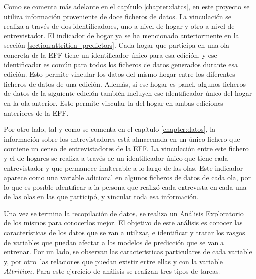 Como se comenta más adelante en el capítulo \ref{chapter:datos}, en este proyecto se utiliza información proveniente de doce ficheros de datos. La vinculación se realiza a través de dos identificadores, uno a nivel de hogar y otro a nivel de entrevistador. El indicador de hogar ya se ha mencionado anteriormente en la sección \ref{section:attrition_predictors}. Cada hogar que participa en una ola concreta de la EFF tiene un identificador único para esa edición, y ese identificador es común para todos los ficheros de datos generados durante esa edición. Esto permite vincular los datos del mismo hogar entre los diferentes ficheros de datos de una edición. Además, si ese hogar es panel, algunos ficheros de datos de la siguiente edición también incluyen ese identificador único del hogar en la ola anterior. Esto permite vincular la del hogar en ambas ediciones anteriores de la EFF.

Por otro lado, tal y como se comenta en el capítulo \ref{chapter:datos}, la información sobre los entrevistadores está almacenada en un único fichero que contiene un censo de entrevistadores de la EFF. La vinculación entre este fichero y el de hogares se realiza a través de un identificador único que tiene cada entrevistador y que permanece inalterable a lo largo de las olas. Este indicador aparece como una variable adicional en algunos ficheros de datos de cada ola, por lo que es posible identificar a la persona que realizó cada entrevista en cada una de las olas en las que participó, y vincular toda esa información.

Una vez se termina la recopilación de datos, se realiza un Análisis Exploratorio de los mismos para conocerlos mejor. El objetivo de este análisis es conocer las características de los datos que se van a utilizar, e identificar y tratar los rasgos de variables que puedan afectar a los modelos de predicción que se van a entrenar. Por un lado, se observan las características particulares de cada variable y, por otro, las relaciones que puedan existir entre ellas y con la variable $Attrition$. Para este ejercicio de análisis se realizan tres tipos de tareas:


